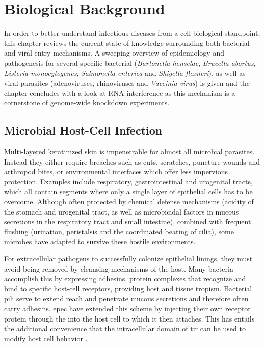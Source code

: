 \chapter{Biological Background}

In order to better understand infectious diseases from a cell biological standpoint, this chapter reviews the current state of knowledge surrounding both bacterial and viral entry mechanisms. A sweeping overview of epidemiology and pathogenesis for several specific bacterial (\textit{Bartonella henselae}, \textit{Brucella abortus}, \textit{Listeria monocytogenes}, \textit{Salmonella enterica} and \textit{Shigella flexneri}), as well as viral parasites (adenoviruses, rhinoviruses and \textit{Vaccinia virus}) is given and the chapter concludes with a look at RNA interference as this mechanism is a cornerstone of genome-wide knockdown experiments.

\section{Microbial Host-Cell Infection}

Multi-layered keratinized skin is impenetrable for almost all microbial parasites. Instead they either require breaches such as cuts, scratches, puncture wounds and arthropod bites, or environmental interfaces which offer less impervious protection. Examples include respiratory, gastrointestinal and urogenital tracts, which all contain segments where only a single layer of epithelial cells has to be overcome. Although often protected by chemical defense mechanisms (acidity of the stomach and urogenital tract, as well as microbicidal factors in mucous secretions in the respiratory tract and small intestine), combined with frequent flushing (urination, peristalsis and the coordinated beating of cilia), some microbes have adapted to survive these hostile environments.

For extracellular pathogens to successfully colonize epithelial linings, they must avoid being removed by cleansing mechanisms of the host. Many bacteria accomplish this by expressing adhesins, protein complexes that recognize and bind to specific host-cell receptors, providing host and tissue tropism. Bacterial pili serve to extend reach and penetrate mucous secretions and therefore often carry adhesins. \Gls{epec} have extended this scheme by injecting their own receptor protein  through the  into the host cell to which it then attaches. This has entails the additional convenience that the intracellular domain of \gls{tir} can be used to modify host cell behavior \citep{Alberts2008}.

